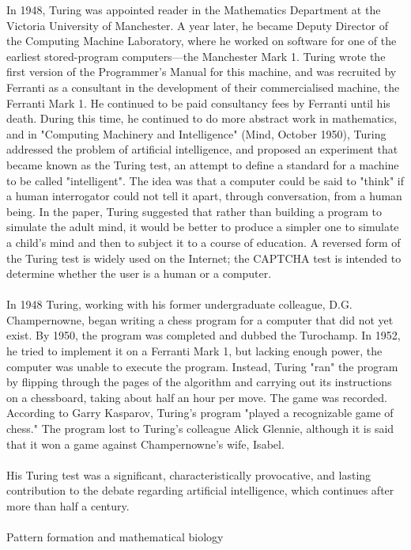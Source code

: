 \documentclass{article}
\begin{document}
In 1948, Turing was appointed reader in the Mathematics Department at the Victoria University of Manchester. A year later, he became Deputy Director of the Computing Machine Laboratory, where he worked on software for one of the earliest stored-program computers—the Manchester Mark 1. Turing wrote the first version of the Programmer's Manual for this machine, and was recruited by Ferranti as a consultant in the development of their commercialised machine, the Ferranti Mark 1. He continued to be paid consultancy fees by Ferranti until his death. During this time, he continued to do more abstract work in mathematics, and in "Computing Machinery and Intelligence" (Mind, October 1950), Turing addressed the problem of artificial intelligence, and proposed an experiment that became known as the Turing test, an attempt to define a standard for a machine to be called "intelligent". The idea was that a computer could be said to "think" if a human interrogator could not tell it apart, through conversation, from a human being. In the paper, Turing suggested that rather than building a program to simulate the adult mind, it would be better to produce a simpler one to simulate a child's mind and then to subject it to a course of education. A reversed form of the Turing test is widely used on the Internet; the CAPTCHA test is intended to determine whether the user is a human or a computer.
\\\\
In 1948 Turing, working with his former undergraduate colleague, D.G. Champernowne, began writing a chess program for a computer that did not yet exist. By 1950, the program was completed and dubbed the Turochamp. In 1952, he tried to implement it on a Ferranti Mark 1, but lacking enough power, the computer was unable to execute the program. Instead, Turing "ran" the program by flipping through the pages of the algorithm and carrying out its instructions on a chessboard, taking about half an hour per move. The game was recorded. According to Garry Kasparov, Turing's program "played a recognizable game of chess." The program lost to Turing's colleague Alick Glennie, although it is said that it won a game against Champernowne's wife, Isabel.
\\\\
His Turing test was a significant, characteristically provocative, and lasting contribution to the debate regarding artificial intelligence, which continues after more than half a century.
\\\\
Pattern formation and mathematical biology
\end{document}
